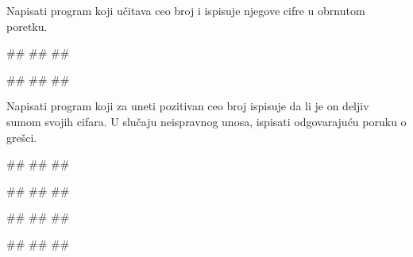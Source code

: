 \begin{Exercise}[label=PET_10] 
Napisati program koji učitava ceo broj i ispisuje njegove cifre u
obrnutom poretku. 

\begin{miditest}
\begin{upotreba}{1}
#\naslovInt#
##
##
\end{upotreba}
\end{miditest}
\begin{miditest}
\begin{upotreba}{2}
#\naslovInt#
##
##
\end{upotreba}
\end{miditest}
\end{Exercise}
\ifresenja
\begin{Answer}[ref=PET_10]
\end{Answer}
\fi


\begin{Exercise}[label=PET_11] 
Napisati program koji za uneti pozitivan ceo broj ispisuje da li je on deljiv
sumom svojih cifara. 
U slučaju neispravnog unosa, ispisati odgovarajuću poruku o grešci. 

\begin{miditest}
\begin{upotreba}{1}
#\naslovInt#
##
##
\end{upotreba}
\end{miditest}
\begin{miditest}
\begin{upotreba}{2}
#\naslovInt#
##
##
\end{upotreba}
\end{miditest}

\begin{miditest}
\begin{upotreba}{3}
#\naslovInt#
##
##
\end{upotreba}
\end{miditest}
\begin{miditest}
\begin{upotreba}{4}
#\naslovInt#
##
##
\end{upotreba}
\end{miditest}
\end{Exercise}
\ifresenja
\begin{Answer}[ref=PET_11]
\end{Answer}
\fi



